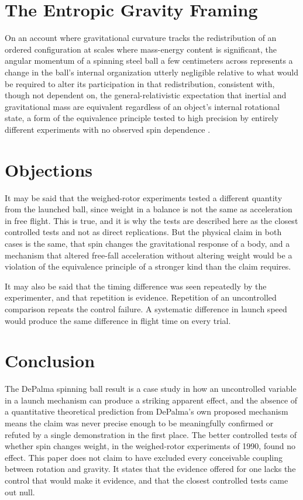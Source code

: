 \documentclass[11pt]{article}
\begin{document}
\section{The Entropic Gravity Framing}

On an account where gravitational curvature tracks the redistribution of an ordered configuration at scales where mass-energy content is significant, the angular momentum of a spinning steel ball a few centimeters across represents a change in the ball's internal organization utterly negligible relative to what would be required to alter its participation in that redistribution, consistent with, though not dependent on, the general-relativistic expectation that inertial and gravitational mass are equivalent regardless of an object's internal rotational state, a form of the equivalence principle tested to high precision by entirely different experiments with no observed spin dependence \cite{T2022}.

\section{Objections}

It may be said that the weighed-rotor experiments tested a different quantity from the launched ball, since weight in a balance is not the same as acceleration in free flight. This is true, and it is why the tests are described here as the closest controlled tests and not as direct replications. But the physical claim in both cases is the same, that spin changes the gravitational response of a body, and a mechanism that altered free-fall acceleration without altering weight would be a violation of the equivalence principle of a stronger kind than the claim requires.

It may also be said that the timing difference was seen repeatedly by the experimenter, and that repetition is evidence. Repetition of an uncontrolled comparison repeats the control failure. A systematic difference in launch speed would produce the same difference in flight time on every trial.

\section{Conclusion}

The DePalma spinning ball result is a case study in how an uncontrolled variable in a launch mechanism can produce a striking apparent effect, and the absence of a quantitative theoretical prediction from DePalma's own proposed mechanism means the claim was never precise enough to be meaningfully confirmed or refuted by a single demonstration in the first place. The better controlled tests of whether spin changes weight, in the weighed-rotor experiments of 1990, found no effect. This paper does not claim to have excluded every conceivable coupling between rotation and gravity. It states that the evidence offered for one lacks the control that would make it evidence, and that the closest controlled tests came out null.
\end{document}
